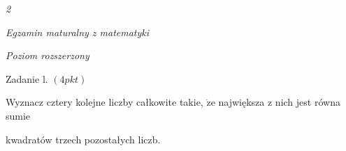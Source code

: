 \documentclass[a4paper,12pt]{article}
\begin{document}
{\it 2}

{\it Egzamin maturalny z matematyki}

{\it Poziom rozszerzony}

Zadanie l. $(4pkt)$

Wyznacz cztery kolejne liczby całkowite takie, $\dot{\mathrm{z}}\mathrm{e}$ największa z nich jest równa sumie

kwadratów trzech pozostałych liczb.
\end{document}
